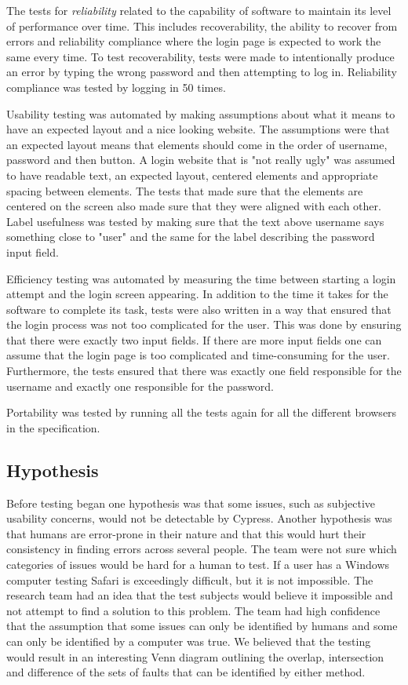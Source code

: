 \documentclass[journal,twocolumn]{IEEEtran}
\begin{document}
The tests for \textit{reliability} related to the capability of software to maintain its level of performance over time. This includes recoverability, the ability to recover from errors and reliability compliance where the login page is expected to work the same every time. To test recoverability, tests were made to intentionally produce an error by typing the wrong password and then attempting to log in. Reliability compliance was tested by logging in 50 times.

Usability testing was automated by making assumptions about what it means to have an expected layout and a nice looking website. The assumptions were that an expected layout means that elements should come in the order of username, password and then button. A login website that is "not really ugly" was assumed to have readable text, an expected layout, centered elements and appropriate spacing between elements. The tests that made sure that the elements are centered on the screen also made sure that they were aligned with each other. Label usefulness was tested by making sure that the text above username says something close to "user" and the same for the label describing the password input field.

Efficiency testing was automated by measuring the time between starting a login attempt and the login screen appearing. In addition to the time it takes for the software to complete its task, tests were also written in a way that ensured that the login process was not too complicated for the user. This was done by ensuring that there were exactly two input fields. If there are more input fields one can assume that the login page is too complicated and time-consuming for the user. Furthermore, the tests ensured that there was exactly one field responsible for the username and exactly one responsible for the password.

Portability was tested by running all the tests again for all the different browsers in the specification.

\subsection{Hypothesis} Before testing began one hypothesis was that some issues, such as subjective usability concerns, would not be detectable by Cypress. Another hypothesis was that humans are error-prone in their nature and that this would hurt their consistency in finding errors across several people. The team were not sure which categories of issues would be hard for a human to test. If a user has a Windows computer testing Safari is exceedingly difficult, but it is not impossible. The research team had an idea that the test subjects would believe it impossible and not attempt to find a solution to this problem. The team had high confidence that the assumption that some issues can only be identified by humans and some can only be identified by a computer was true. We believed that the testing would result in an interesting Venn diagram outlining the overlap, intersection and difference of the sets of faults that can be identified by either method.
\end{document}
